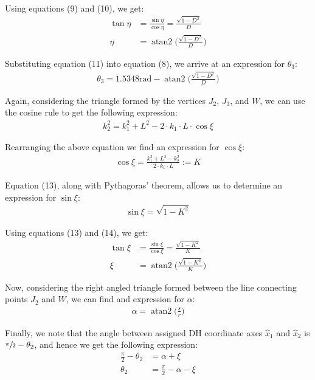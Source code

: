 \documentclass[a4paper]{article}
\DeclareMathOperator{\atantwo}{atan2}
\begin{document}
Using equations (9) and (10), we get:
\begin{align}
\tan \eta &= \frac{\sin \eta}{\cos \eta} = \frac{\sqrt{1 - D^2}}{D} \nonumber\\
\eta &= \atantwo \bigg(\frac{\sqrt{1-D^2}}{D}\bigg)
\end{align}

Substituting equation (11) into equation (8), we arrive at an expression for $\theta_3$:
\begin{align}
\theta_3 = 1.5348\si{\radian} - \atantwo \bigg(\frac{\sqrt{1 - D^2}}{D}\bigg)
\end{align}

Again, considering the triangle formed by the vertices $J_2$, $J_3$, and $W$, we can use the cosine rule to get the following expression:
\begin{align*}
k_2^2 = k_1^2 + L^2 - 2 \cdot k_1 \cdot L \cdot \cos \xi
\end{align*}

Rearranging the above equation we find an expression for $\cos \xi$:
\begin{align}
\cos \xi = \frac{k_1^2 + L^2 - k_2^2}{2 \cdot k_1 \cdot L} := K
\end{align}

Equation (13), along with Pythagoras' theorem, allows us to determine an expression for $\sin \xi$:
\begin{align}
\sin \xi = \sqrt{1 - K^2}
\end{align}

Using equations (13) and (14), we get:
\begin{align}
\tan \xi &= \frac{\sin \xi}{\cos \xi} = \frac{\sqrt{1 - K^2}}{K} \nonumber\\
\xi &= \atantwo \bigg(\frac{\sqrt{1-K^2}}{K}\bigg)
\end{align}

Now, considering the right angled triangle formed between the line connecting points $J_2$ and $W$, we can find and expression for $\alpha$:
\begin{align}
\alpha = \atantwo \bigg(\frac{s}{r}\bigg)
\end{align}

Finally, we note that the angle between assigned DH coordinate axes $\hat{x}_1$ and $\hat{x}_2$ is $\sfrac{\pi}{2} - \theta_2$, and hence we get the following expression:
\begin{align}
\frac{\pi}{2} - \theta_2 &= \alpha + \xi \nonumber\\
\theta_2 &= \frac{\pi}{2} - \alpha - \xi
\end{align}
\end{document}
